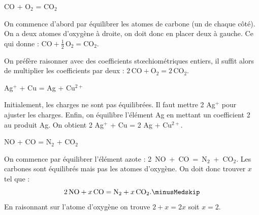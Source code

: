 
\begin{enonce}
CO + O$_2$ = CO$_2$
\end{enonce}


\begin{corrige}
On commence d'abord par équilibrer les atomes de carbone (un de chaque côté). On a deux atomes d'oxygène à droite, on doit donc en placer deux à gauche. Ce qui donne : $\mathrm{CO}+\frac12\,\mathrm{O_2}=\mathrm{CO_2}$.
 
On préfère raisonner avec des coefficients st\oe{}chiométriques entiers, il suffit alors de multiplier les coefficients par deux : $2\,\mathrm{CO}+\mathrm{O_2}=2\,\mathrm{CO_2}$. 

\end{corrige}




\begin{enonce}
Ag$^+$ + Cu = Ag + Cu$^{2+}$
\end{enonce}


\begin{corrige}
Initialement, les charges ne sont pas équilibrées. Il faut mettre 2 Ag$^+$ pour ajuster les charges. Enfin, on équilibre l'élément Ag en mettant un coefficient 2 au produit Ag. On obtient 2 Ag$^+$ + Cu = 2 Ag + Cu$^{2+}$.
\end{corrige}




\begin{enonce}
NO + CO = N$_2$ + CO$_2$
\end{enonce}


\begin{corrige}
On commence par équilibrer l'élément azote : 2~NO~+~CO~=~N$_2$~+~CO$_2$. 
Les carbones sont équilibrés mais pas les atomes d'oxygène. On doit donc trouver $x$ tel que : \minusMedskip
\[
2\,\mathrm{NO}+x\,\mathrm{CO}=\mathrm{N_2}+x\,\mathrm{CO_2}. \minusMedskip
\]
En raisonnant sur l'atome d'oxygène on trouve $2+x=2x$ soit $x=2$.
\end{corrige}

